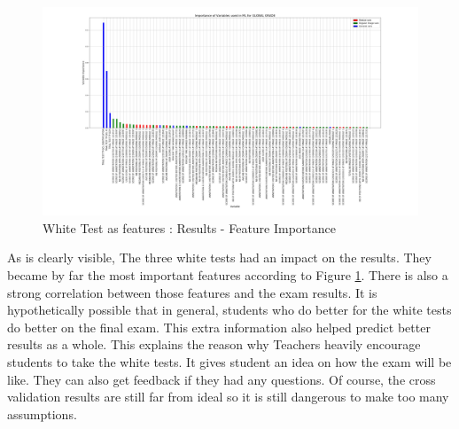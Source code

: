 \documentclass[a4paper,11pt]{report}
\numberwithin{figure}{section} %
\begin{document}
      \begin{figure}[H]
      \centering
      \includegraphics[width=.95\linewidth]{plots/test1_var_importance_GLOBAL_GRADE_2018-05-17_10_12_18.png}
      \caption{White Test as features : Results - Feature Importance}
      \label{fig:test1_2}
      \end{figure}
    As is clearly visible, The three white tests had an impact on the results.
    They became by far the most important features according to Figure \ref{fig:test1_2}.
    There is also a strong correlation between those features and the exam results.
    It is hypothetically possible that in general, students who do better for the white tests do better on the final exam.
    This extra information also helped predict better results as a whole.
    This explains the reason why Teachers heavily encourage students to take the white tests.
    It gives student an idea on how the exam will be like.
    They can also get feedback if they had any questions.
    Of course, the cross validation results are still far from ideal so it is still dangerous to make too many assumptions.\\
\end{document}
